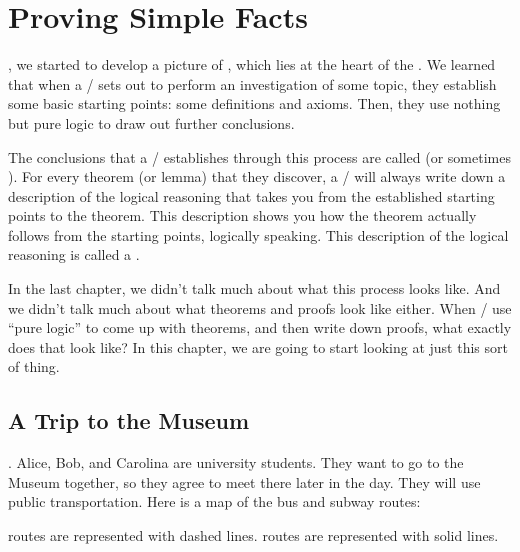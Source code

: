 \documentclass[../../../main.tex]{subfiles}
\begin{document}
\chapter{Proving Simple Facts}

, we started to develop a picture of , which lies at the heart of the . We learned that when a \mather/ sets out to perform an investigation of some topic, they establish some basic starting points: some definitions and axioms. Then, they use nothing but pure logic to draw out further conclusions.

The conclusions that a \mather/ establishes through this process are called  (or sometimes ). For every theorem (or lemma) that they discover, a \mather/ will always write down a description of the logical reasoning that takes you from the established starting points to the theorem. This description shows you how the theorem actually follows from the starting points, logically speaking. This description of the logical reasoning is called a .

In the last chapter, we didn't talk much about what this process looks like. And we didn't talk much about what theorems and proofs look like either. When \mathers/ use ``pure logic'' to come up with theorems, and then write down proofs, what exactly does that look like? In this chapter, we are going to start looking at just this sort of thing.


\section{A Trip to the Museum}

. Alice, Bob, and Carolina are university students. They want to go to the Museum together, so they agree to meet there later in the day. They will use public transportation. Here is a map of the bus and subway routes:

\begin{aside}
   routes are represented with dashed lines.
   routes are represented with solid lines.
\end{aside}
\end{document}
